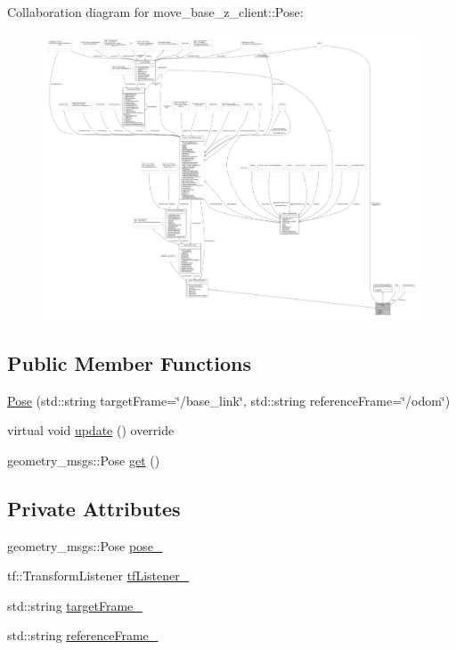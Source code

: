 Collaboration diagram for move\+\_\+base\+\_\+z\+\_\+client\+:\+:Pose\+:
\nopagebreak
\begin{figure}[H]
\begin{center}
\leavevmode
\includegraphics[width=350pt]{classmove__base__z__client_1_1Pose__coll__graph}
\end{center}
\end{figure}
\subsection*{Public Member Functions}
\begin{DoxyCompactItemize}
\item 
\hyperlink{classmove__base__z__client_1_1Pose_a250b93daff3628f0fe255c31f4f95d15}{Pose} (std\+::string target\+Frame=\char`\"{}/base\+\_\+link\char`\"{}, std\+::string reference\+Frame=\char`\"{}/odom\char`\"{})
\item 
virtual void \hyperlink{classmove__base__z__client_1_1Pose_ad094a81813138d975632a2ae492c51f8}{update} () override
\item 
geometry\+\_\+msgs\+::\+Pose \hyperlink{classmove__base__z__client_1_1Pose_aff06e2c3d38159f35829fb9285a110b6}{get} ()
\end{DoxyCompactItemize}
\subsection*{Private Attributes}
\begin{DoxyCompactItemize}
\item 
geometry\+\_\+msgs\+::\+Pose \hyperlink{classmove__base__z__client_1_1Pose_a81995c2933c1ad72b19b31b89179e6a4}{pose\+\_\+}
\item 
tf\+::\+Transform\+Listener \hyperlink{classmove__base__z__client_1_1Pose_ac932048a4bb8e389642c290b2c8dcefc}{tf\+Listener\+\_\+}
\item 
std\+::string \hyperlink{classmove__base__z__client_1_1Pose_a268cfb00a32306e9f8ec80479addda9e}{target\+Frame\+\_\+}
\item 
std\+::string \hyperlink{classmove__base__z__client_1_1Pose_a38e1a906cb238d648e46bf7e8fa72fd8}{reference\+Frame\+\_\+}
\end{DoxyCompactItemize}

